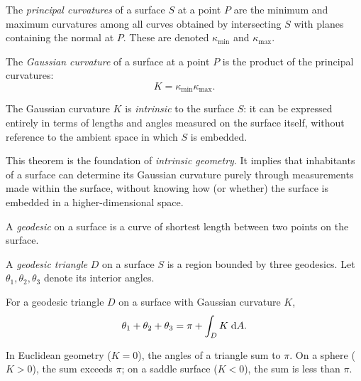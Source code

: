 \documentclass[a4paper]{article}
\begin{document}
\begin{defi}
  The \emph{principal curvatures} of a surface $S$ at a point $P$ are the minimum and maximum curvatures among all curves obtained by intersecting $S$ with planes containing the normal at $P$. These are denoted $\kappa_{\min}$ and $\kappa_{\max}$.
\end{defi}

\begin{defi}
  The \emph{Gaussian curvature} of a surface at a point $P$ is the product of the principal curvatures:
  \[
    K = \kappa_{\min}\kappa_{\max}.
  \]
\end{defi}

\begin{thm}
  The Gaussian curvature $K$ is \emph{intrinsic} to the surface $S$: it can be expressed entirely in terms of lengths and angles measured on the surface itself, without reference to the ambient space in which $S$ is embedded.
\end{thm}

\begin{rmk}
  This theorem is the foundation of \emph{intrinsic geometry}. It implies that inhabitants of a surface can determine its Gaussian curvature purely through measurements made within the surface, without knowing how (or whether) the surface is embedded in a higher-dimensional space.
\end{rmk}

\begin{defi}[Geodesic]
  A \emph{geodesic} on a surface is a curve of shortest length between two points on the surface.
\end{defi}

\begin{defi}
  A \emph{geodesic triangle} $D$ on a surface $S$ is a region bounded by three geodesics. Let $\theta_1, \theta_2, \theta_3$ denote its interior angles.
\end{defi}

\begin{thm}
  For a geodesic triangle $D$ on a surface with Gaussian curvature $K$,
  \[
    \theta_1 + \theta_2 + \theta_3 = \pi + \int_D K\; \mathrm{d} A.
  \]
\end{thm}

\begin{rmk}
  In Euclidean geometry ($K = 0$), the angles of a triangle sum to $\pi$. On a sphere ($K > 0$), the sum exceeds $\pi$; on a saddle surface ($K < 0$), the sum is less than $\pi$.
\end{rmk}
\end{document}
